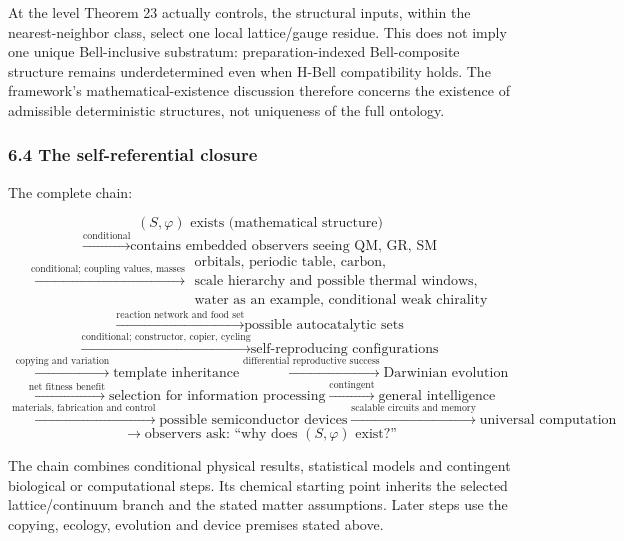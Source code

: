 \documentclass[
]{article}
\begin{document}
At the level Theorem 23 actually controls, the structural inputs, within
the nearest-neighbor class, select one local lattice/gauge residue. This
does not imply one unique Bell-inclusive substratum: preparation-indexed
Bell-composite structure remains underdetermined even when H-Bell
compatibility holds. The framework's mathematical-existence discussion
therefore concerns the existence of admissible deterministic structures,
not uniqueness of the full ontology.

\hypertarget{the-self-referential-closure}{%
\subsubsection{6.4 The self-referential
closure}\label{the-self-referential-closure}}

The complete chain:

\[(S, \varphi) \text{ exists (mathematical structure)}\]
\[\xrightarrow{\text{conditional}} \text{contains embedded observers seeing QM, GR, SM}\]
\[\xrightarrow{\text{conditional; coupling values, masses}} \begin{gathered}
\text{orbitals, periodic table, carbon,}\\
\text{scale hierarchy and possible thermal windows,}\\
\text{water as an example, conditional weak chirality}
\end{gathered}\]
\[\xrightarrow{\text{reaction network and food set}} \text{possible autocatalytic sets}\]
\[\xrightarrow{\text{conditional; constructor, copier, cycling}} \text{self-reproducing configurations}\]
\[\xrightarrow{\text{copying and variation}} \text{template inheritance} \xrightarrow{\text{differential reproductive success}} \text{Darwinian evolution}\]
\[\xrightarrow{\text{net fitness benefit}} \text{selection for information processing} \xrightarrow{\text{contingent}} \text{general intelligence}\]
\[\xrightarrow{\text{materials, fabrication and control}} \text{possible semiconductor devices} \xrightarrow{\text{scalable circuits and memory}} \text{universal computation}\]
\[\xrightarrow{} \text{observers ask: ``why does } (S, \varphi) \text{ exist?''}\]

The chain combines conditional physical results, statistical models and
contingent biological or computational steps. Its chemical starting
point inherits the selected lattice/continuum branch and the stated
matter assumptions. Later steps use the copying, ecology, evolution and
device premises stated above.
\end{document}

